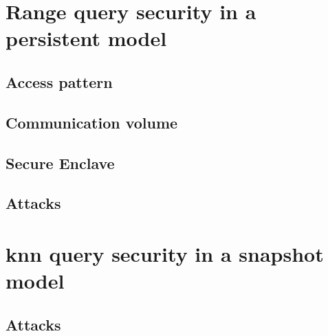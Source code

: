 	\section{Range query security in a persistent model}

		\subsection{Access pattern}

		\subsection{Communication volume}

		\subsection{Secure Enclave}

		\subsection{Attacks}

	\section{\texorpdfstring{\acrshort{knn}}{kNN} query security in a snapshot model}

		\subsection{Attacks}
